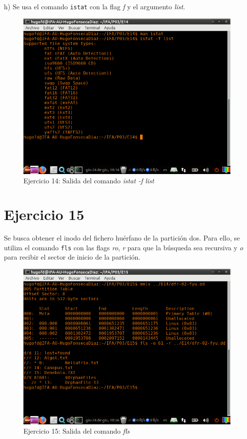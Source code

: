 \documentclass[11pt]{article}
\begin{document}
h) Se usa el comando \verb|istat| con la flag \textit{f} y el argumento \textit{list}.

\begin{figure}[H]
    \caption{Ejercicio 14: Salida del comando \textit{istat -f list}}
    \centering
    \includegraphics[scale=0.7]{e14-7.png}
\end{figure}

\section{Ejercicio 15}
Se busca obtener el inodo del fichero huérfano de la partición dos. Para ello, se utiliza el comando \verb|fls| con las flags \textit{ro}, \textit{r} para que la búsqueda sea recursiva y \textit{o} para recibir el sector de inicio de la partición.

\begin{figure}[H]
    \caption{Ejercicio 15: Salida del comando \textit{fls}}
    \centering
    \includegraphics[scale=0.7]{e15-1.png}
\end{figure}
\end{document}
